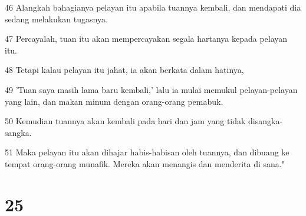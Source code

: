 \par 46 Alangkah bahagianya pelayan itu apabila tuannya kembali, dan mendapati dia sedang melakukan tugasnya.
\par 47 Percayalah, tuan itu akan mempercayakan segala hartanya kepada pelayan itu.
\par 48 Tetapi kalau pelayan itu jahat, ia akan berkata dalam hatinya,
\par 49 'Tuan saya masih lama baru kembali,' lalu ia mulai memukul pelayan-pelayan yang lain, dan makan minum dengan orang-orang pemabuk.
\par 50 Kemudian tuannya akan kembali pada hari dan jam yang tidak disangka-sangka.
\par 51 Maka pelayan itu akan dihajar habis-habisan oleh tuannya, dan dibuang ke tempat orang-orang munafik. Mereka akan menangis dan menderita di sana."

\chapter{25}

